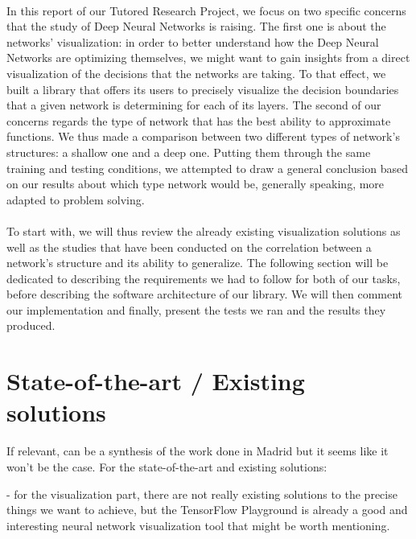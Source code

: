 \documentclass[a4paper]{article}
\begin{document}
\paragraph{}In this report of our Tutored Research Project, we focus on two specific concerns that the study of Deep Neural Networks is raising. The first one is about the networks' visualization: in order to better understand how the Deep Neural Networks are optimizing themselves, we might want to gain insights from a direct visualization of the decisions that the networks are taking. To that effect, we built a library that offers its users to precisely visualize the decision boundaries that a given network is determining for each of its layers. The second of our concerns regards the type of network that has the best ability to approximate functions. We thus made a comparison between two different types of network's structures: a shallow one and a deep one. Putting them through the same training and testing conditions, we attempted to draw a general conclusion based on our results about which type network would be, generally speaking, more adapted to problem solving. 

\paragraph{}To start with, we will thus review the already existing visualization solutions as well as the studies that have been conducted on the correlation between a network's structure and its ability to generalize. The following section will be dedicated to describing the requirements we had to follow for both of our tasks, before describing the software architecture of our library. We will then comment our implementation and finally, present the tests we ran and the results they produced.




\section{State-of-the-art / Existing solutions}
If relevant, can be a synthesis of the work done in Madrid but it seems like it won't be the case. For the state-of-the-art and existing solutions:


- for the visualization part, there are not really existing solutions to the precise things we want to achieve, but the TensorFlow Playground is already a good and interesting neural network visualization tool that might be worth mentioning.
\end{document}
